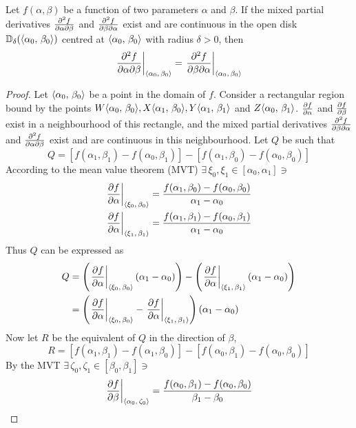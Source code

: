 \begin{lemma}
	Let $f(\alpha,\beta)$ be a function of two parameters $\alpha$ and $\beta$. If the mixed partial derivatives $\pdv{f}{\alpha}{\beta}$
	and $\pdv{f}{\beta}{\alpha}$ exist and are continuous in the open disk $\mathbb{D}_\delta(\langle\alpha_0,\,\beta_0\rangle)$ centred at
	$\langle\alpha_0,\,\beta_0\rangle$ with radius $\delta>0$, then
	$$
		\eval{\pdv{f}{\alpha}{\beta}}_{\point{\alpha_0}{\beta_0}}=\eval{\pdv{f}{\beta}{\alpha}}_{\point{\alpha_0}{\beta_0}}
	$$
	\begin{proof}
		Let $\langle\alpha_0,\,\beta_0\rangle$ be a point in the domain of $f$. Consider a rectangular region bound by the
		points $W\langle\alpha_0,\,\beta_0\rangle,X\langle\alpha_1,\,\beta_0\rangle, Y\langle\alpha_1,\,\beta_1\rangle$  and $Z\langle\alpha_0,\,\beta_1\rangle$. 
		$\pdv{f}{\alpha}$ and $\pdv{f}{\beta}$ exist in a neighbourhood of this rectangle, and the mixed partial derivatives 
		$\pdv{f}{\beta}{\alpha}$ and $\pdv{f}{\alpha}{\beta}$ exist and are continuous in this neighbourhood. Let $Q$ be such that
		$$
		Q=[f(\alpha_1,\beta_1)-f(\alpha_0,\beta_1)]-[f(\alpha_1,\beta_0)-f(\alpha_0,\beta_0)]
		$$
		According to the mean value theorem (MVT) $\exists\,\xi_0,\xi_1\in[\alpha_0,\alpha_1]\ni$
		\begin{align*}
			\eval{\pdv{f}{\alpha}}_{\point{\xi_0}{\beta_0}}&=\frac{f(\alpha_1,\beta_0)-f(\alpha_0,\beta_0)}{\alpha_1-\alpha_0}\\
			\eval{\pdv{f}{\alpha}}_{\point{\xi_1}{\beta_1}}&=\frac{f(\alpha_1,\beta_1)-f(\alpha_0,\beta_1)}{\alpha_1-\alpha_0}
		\end{align*}
		Thus $Q$ can be expressed as
		\begin{align*}
			Q&=\left(\eval{\pdv{f}{\alpha}}_{\point{\xi_0}{\beta_0}}\left(\alpha_1-\alpha_0\right)\right)-\left(\eval{\pdv{f}{\alpha}}_{\point{\xi_1}{\beta_1}}\left(\alpha_1-\alpha_0\right)\right)\\
			&=\left(\eval{\pdv{f}{\alpha}}_{\point{\xi_0}{\beta_0}}-\eval{\pdv{f}{\alpha}}_{\point{\xi_1}{\beta_1}}\right)\left(\alpha_1-\alpha_0\right)
		\end{align*}
		Now let $R$ be the equivalent of $Q$ in the direction of $\beta$,
		$$
			R=[f(\alpha_1,\beta_1)-f(\alpha_1,\beta_0)]-[f(\alpha_0,\beta_1)-f(\alpha_0,\beta_0)]
		$$
		By the MVT $\exists\,\zeta_0,\zeta_1\in[\beta_0,\beta_1]\ni$
		\begin{align*}
			\eval{\pdv{f}{\beta}}_{\point{\alpha_0}{\zeta_0}}&=\frac{f(\alpha_0,\beta_1)-f(\alpha_0,\beta_0)}{\beta_1-\beta_0}\\

\end{align*}
\end{proof}
\end{lemma}
